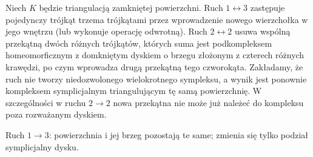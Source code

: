 \begin{definicja}
Niech $K$ będzie triangulacją zamkniętej powierzchni.
Ruch $1\leftrightarrow3$ zastępuje pojedynczy trójkąt
trzema trójkątami przez wprowadzenie nowego wierzchołka
w jego wnętrzu (lub wykonuje operację odwrotną).
Ruch $2\leftrightarrow2$ usuwa wspólną przekątną dwóch
różnych trójkątów, których suma jest podkompleksem
homeomorficznym z domkniętym dyskiem o brzegu złożonym
z czterech różnych krawędzi, po czym wprowadza drugą
przekątną tego czworokąta. Zakładamy, że ruch nie tworzy
niedozwolonego wielokrotnego sympleksu, a wynik jest
ponownie kompleksem symplicjalnym triangulującym tę samą
powierzchnię. W szczególności w ruchu $2\to2$ nowa
przekątna nie może już należeć do kompleksu poza
rozważanym dyskiem.
\end{definicja}

\begin{samepage}
\begin{center}
\begin{minipage}{.96\linewidth}\centering
{}\par\smallskip

{\footnotesize Ruch $1\to3$: powierzchnia i jej brzeg pozostają te same;
zmienia się tylko podział symplicjalny dysku.}
\end{minipage}
\end{center}
\end{samepage}

